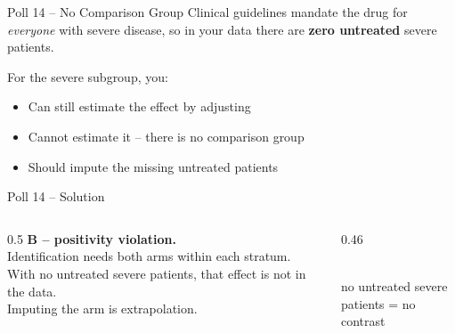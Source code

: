 \documentclass[aspectratio=169]{beamer}
\begin{document}
\begin{frame}{Poll 14 \;--\; No Comparison Group}
  \small
  Clinical guidelines mandate the drug for \emph{everyone} with severe disease,
  so in your data there are \textbf{zero untreated} severe patients.
  \vspace{0.8em}

  For the severe subgroup, you:
  \begin{itemize}
    \item[\textbf{A.}] Can still estimate the effect by adjusting
    \item[\textbf{B.}] Cannot estimate it -- there is no comparison group
    \item[\textbf{C.}] Should impute the missing untreated patients
  \end{itemize}
\end{frame}

\begin{frame}{Poll 14 \;--\; Solution}
  \small
  \begin{columns}[T]
    \begin{column}{0.5\textwidth}
      \textcolor{good}{\textbf{B -- positivity violation.}}\\[0.4em]
      Identification needs both arms within each stratum. With no untreated
      severe patients, that effect is not in the data.\\[0.2em]
      \textcolor{brick}{Imputing the arm is extrapolation.}
    \end{column}
    \begin{column}{0.46\textwidth}
      \centering
      \\[0.3em]
      {\scriptsize no untreated severe patients = no contrast}
    \end{column}
  \end{columns}
\end{frame}
\end{document}
